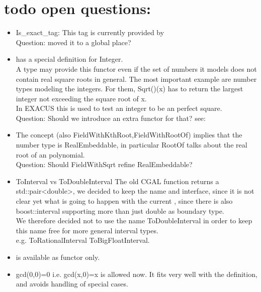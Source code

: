 


\section{todo open questions:}

\begin{itemize} 
\item Is\_exact\_tag: This tag is currently provided by \\
Question: moved it to a global place? 
\item {} has a special definition for Integer. \\
        A type may provide this functor even if the set of 
        numbers it models does not contain real square roots in general. 
        The most important example are number types modeling the integers. 
        For them, Sqrt()(x) has to return the largest integer not exceeding 
        the square root of x.\\
        In EXACUS this is used to test an integer to be an perfect square. \\
        Question: Should we introduce an extra functor for that?
        see: 
\item The concept  (also FieldWithKthRoot,FieldWithRootOf) 
      implies that the number type is RealEmbeddable, in particular RootOf talks 
      about the real root of an polynomial.\\
      Question: Should FieldWithSqrt refine RealEmbeddable?  
\item ToInterval vs ToDoubleInterval The old CGAL function 
       returns a
      std::pair<double>, we decided to keep the name and interface, since it is not 
      clear yet what is going to happen with the current , 
      since there is also boost::interval supporting more than just double as 
      boundary type.\\
      We therefore decided not to use the name ToDoubleInterval in order to keep 
      this name free for more general interval types. \\
      e.g. ToRationalInterval ToBigFloatInterval. 
\item {} is available as functor only.
\item gcd(0,0)=0 i.e. gcd(x,0)=x is allowed now. 
      It fits very well with the definition,  and avoids handling of special cases. 
\end{itemize}

